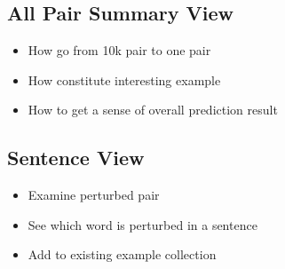 \subsection{All Pair Summary View}
\begin{itemize}
\item How go from 10k pair to one pair
\item How constitute interesting example
\item How to get a sense of overall prediction result
\end{itemize}

\subsection{Sentence View}
\begin{itemize}
\item Examine perturbed pair
\item See which word is perturbed in a sentence
\item Add to existing example collection
\end{itemize}
